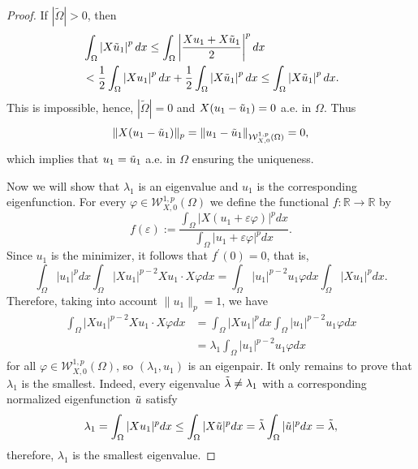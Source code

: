 \documentclass[a4paper,12pt,reqno]{amsart}
\numberwithin{equation}{section}
\theoremstyle{plain}
\theoremstyle{definition}
\begin{document}
\begin{proof}
If  $|\widetilde{\Omega}|>0$,
then
\begin{equation*}
\begin{aligned}
&\int_{\Omega}\left|X\Tilde{u}_{1}\right|^{p} d x \leq \int_{\Omega}\left|\frac{Xu_{1}+X\Tilde{u}_{1}}{2}\right|^{p} d x\\
&<\frac{1}{2} \int_{\Omega}\left|Xu_{1}\right|^{p} d x+\frac{1}{2} \int_{\Omega}\left|X\Tilde{u}_{1}\right|^{p} d x \leq \int_{\Omega}\left|X\Tilde{u}_{1}\right|^{p} d x.
\end{aligned}
\end{equation*}
This is impossible, hence, $|\widetilde{\Omega}|=0$ and $ X(u_{1}-\Tilde{u}_{1}) = 0$ a.e. in $\Omega$. Thus $$\|X(u_{1}-\Tilde{u}_{1})\|_{p}=\|u_{1}-\Tilde{u}_{1}\|_{\mathcal{W}_{X,0}^{1, p}(\Omega)}=0,$$
which implies that $u_{1}=\Tilde{u}_{1}$ a.e. in $\Omega$ ensuring the uniqueness.

Now we will show that  $\lambda_{1}$ is an eigenvalue and $u_{1}$ is the corresponding eigenfunction. For every $\varphi\in \mathcal{W}_{X,0}^{1, p}(\Omega)$  we define the functional  $f:\mathbb{R}\to \mathbb{R}$ by
\begin{equation*}
f(\varepsilon):=\frac{\int_{\Omega}|X(u_{1}+\varepsilon \varphi)|^{p} d x}{\int_{\Omega}|u_{1}+\varepsilon \varphi|^{p} d x}.
\end{equation*}
Since $u_{1}$ is the minimizer,
it follows that  $f^{\prime}(0)=0$, that is,
\begin{equation*}
\int_{\Omega}|u_{1}|^{p} d x \int_{\Omega}|X u_{1}|^{p-2} X u_{1} \cdot X \varphi d x=\int_{\Omega}|u_{1}|^{p-2} u_{1} \varphi d x \int_{\Omega}|X u_{1}|^{p} d x.
\end{equation*}
Therefore, taking into account $\|u_{1}\|_{p}=1$, we have
\begin{equation*}
\begin{aligned}
\int_{\Omega}|X u_{1}|^{p-2} X u_{1} \cdot X \varphi d x &= \int_{\Omega}|X u_{1}|^{p} d x \int_{\Omega}|u_{1}|^{p-2} u_{1} \varphi dx\\
&=\lambda_{1} \int_{\Omega}|u_{1}|^{p-2} u_{1} \varphi d x
\end{aligned}
\end{equation*}
for all $\varphi\in \mathcal{W}_{X,0}^{1, p}(\Omega)$, so $(\lambda_{1}, u_{1})$ is an eigenpair. It only remains to prove that $\lambda_{1}$ is the smallest. Indeed, every eigenvalue $\Tilde{\lambda}\neq\lambda_{1}$ with a corresponding normalized eigenfunction $\Tilde{u}$ satisfy
\begin{equation*}
\lambda_{1}=\int_{\Omega}|X u_{1}|^p d x\leq \int_{\Omega}|X \Tilde{u}|^p d x=\Tilde{\lambda} \int_{\Omega} |\Tilde{u}|^{p}d x=\Tilde{\lambda},
\end{equation*}
therefore, $\lambda_{1}$ is the smallest eigenvalue.
\end{proof}
\end{document}
